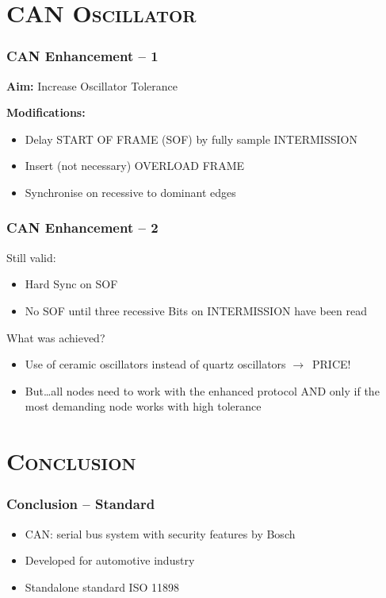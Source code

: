 \documentclass[xcolor=x11names,compress]{beamer}
\renewcommand{\(}{\begin{columns}}
\renewcommand{\)}{\end{columns}}
\newcommand{\<}[1]{\begin{column}{#1}}
\renewcommand{\>}{\end{column}}
\begin{document}
\section{\scshape CAN Oscillator}
\begin{frame}
  \frametitle{CAN Enhancement -- 1}

\textbf{Aim:} Increase Oscillator Tolerance
\vspace{0.3cm}

\textbf{Modifications:}
\begin{itemize}
    \item Delay START OF FRAME (SOF) by fully sample INTERMISSION
    \item Insert (not necessary) OVERLOAD FRAME
    \item Synchronise on recessive to dominant edges
\end{itemize}

\end{frame}

\begin{frame}
  \frametitle{CAN Enhancement -- 2}
Still valid:
\begin{itemize}
    \item Hard Sync on SOF 
    \item No SOF until three recessive Bits on INTERMISSION have been read
\end{itemize}

What was achieved?
\begin{itemize}
  \item Use of ceramic oscillators instead of quartz oscillators $\rightarrow$~PRICE!
  \item But\ldots all nodes need to work with the enhanced protocol AND only if the most demanding node works with high tolerance
\end{itemize}

\end{frame}

\section{\scshape Conclusion}

\begin{frame}
  \frametitle{Conclusion -- Standard}

\begin{itemize}
 \item CAN: serial bus system with security features by Bosch
 \item Developed for automotive industry
 \item Standalone standard ISO 11898
\end{itemize}

\end{frame}
\end{document}
